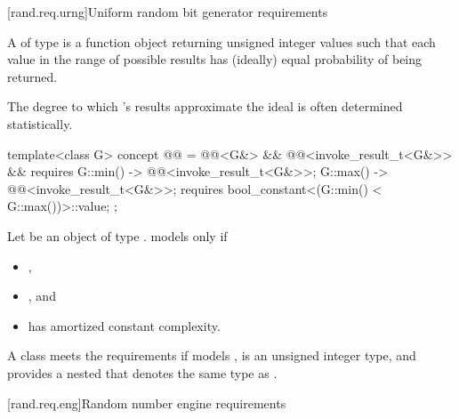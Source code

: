 
[rand.req.urng]{Uniform random bit generator requirements}%
%

\pnum
A 
 of type 
is a function object
returning unsigned integer values
such that each value
in the range of possible results
has (ideally) equal probability
of being returned.
\begin{note}
 The degree to which 's results
 approximate the ideal
 is often determined statistically.
\end{note}

\begin{codeblock}
template<class G>
  concept @@ =
    @@<G&> && @@<invoke_result_t<G&>> &&
    requires {
      { G::min() } -> @@<invoke_result_t<G&>>;
      { G::max() } -> @@<invoke_result_t<G&>>;
      requires bool_constant<(G::min() < G::max())>::value;
    };
\end{codeblock}

\pnum
Let  be an object of type .  models
 only if
\begin{itemize}
\item {},
\item {}, and
\item {} has amortized constant complexity.
\end{itemize}

%
%
\pnum
A class  meets the  requirements if
 models ,
 is an unsigned integer type,
and
 provides a nested  
that denotes the same type as .



[rand.req.eng]{Random number engine requirements}%
%


